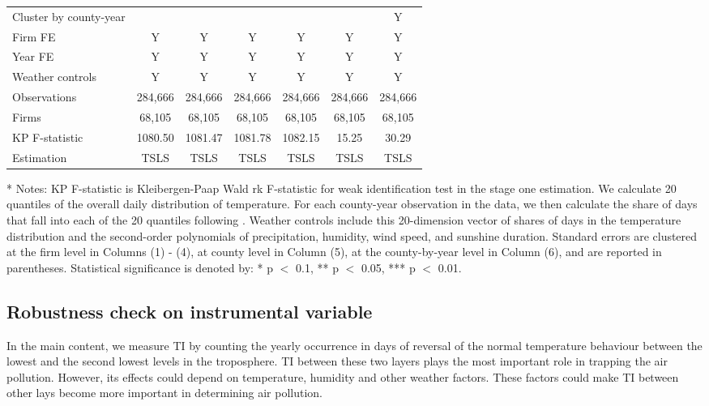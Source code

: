 \documentclass[12pt]{article}
\begin{document}
\begin{table}[H]
{\begin{tabular}{l*{6}{c}}
        Cluster by county-year&&&&&&Y\\
        Firm FE &Y&Y&Y&Y&Y&Y\\
        Year FE &Y&Y&Y&Y&Y&Y\\
        Weather controls &Y&Y&Y&Y&Y&Y\\
        \hline
        Observations    &284,666&284,666&284,666  &284,666&284,666&284,666\\
        Firms           &68,105 &68,105 &68,105   &68,105&68,105&68,105\\
        KP F-statistic   &1080.50 &1081.47& 1081.78&1082.15&15.25&30.29\\
        Estimation      &TSLS&TSLS&TSLS&TSLS&TSLS&TSLS \\
        \hline\hline
      \end{tabular}
      }
      \begin{tablenotes}
        \item[*] \small Notes:  KP F-statistic is Kleibergen-Paap Wald rk F-statistic for weak identification test in the stage one estimation. We calculate 20 quantiles of the overall daily distribution of temperature. For each county-year observation in the data, we then calculate the share of days that fall into each of the 20 quantiles following \citep{deschenes2017defensive}. Weather controls include this 20-dimension vector of shares of days in the temperature distribution and the second-order polynomials of precipitation, humidity, wind speed, and sunshine duration. Standard errors are clustered at the firm level in Columns (1) - (4), at county level in Column (5), at the county-by-year level in Column (6), and are reported in parentheses. Statistical significance is denoted by: * p $<$ 0.1, ** p $<$ 0.05, *** p $<$ 0.01.
      \end{tablenotes}
      \end{table}
    
    \subsection{Robustness check on instrumental variable}
    In the main content, we measure TI by counting the yearly occurrence in days of reversal of the normal temperature behaviour between the lowest and the second lowest levels in the troposphere. TI between these two layers plays the most important role in trapping the air pollution. However, its effects could depend on temperature, humidity and other weather factors. These factors could make TI between other lays become more important in determining air pollution. 
    
\end{document}
